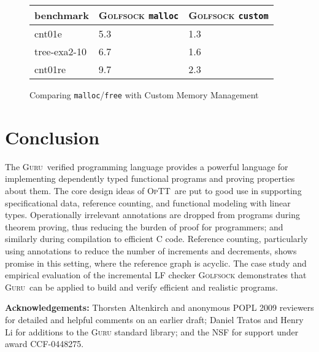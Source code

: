 \documentclass[preprint,natbib]{sigplanconf}
\newcommand{\optt}{\textsc{OpTT}}
\newcommand{\guru}[0]{\textsc{Guru}}
\begin{document}
\begin{figure}
\footnotesize
\begin{center}
\begin{tabular}{|l|l|l|}
\hline
\textbf{benchmark} & \textsc{Golfsock} \texttt{malloc} & \textsc{Golfsock} \texttt{custom}
\\
\hline
cnt01e
&
5.3
&
1.3
\\
tree-exa2-10
&
6.7
&
1.6
\\
cnt01re
&
9.7
&
2.3
\\
\hline
\end{tabular}
\end{center}
\caption{\label{fig:qbf2}Comparing \texttt{malloc}/\texttt{free} with Custom Memory Management}
\end{figure}

\section{Conclusion}

The \guru\ verified programming language provides a powerful language
for implementing dependently typed functional programs and proving
properties about them.  The core design ideas of \optt\ are put to
good use in supporting specificational data, reference counting, and
functional modeling with linear types.  Operationally irrelevant
annotations are dropped from programs during theorem proving, thus
reducing the burden of proof for programmers; and similarly during
compilation to efficient C code.  Reference counting, particularly
using annotations to reduce the number of increments and decrements,
shows promise in this setting, where the reference graph is acyclic.
The case study and empirical evaluation of the incremental LF checker
\textsc{Golfsock} demonstrates that \guru\ can be applied to build and
verify efficient and realistic programs.

\textbf{Acknowledgements:} Thorsten Altenkirch and anonymous POPL 2009
reviewers for detailed and helpful comments on an earlier draft;
Daniel Tratos and Henry Li for additions to the \textsc{Guru} standard
library; and the NSF for support under award CCF-0448275.




\end{document}

